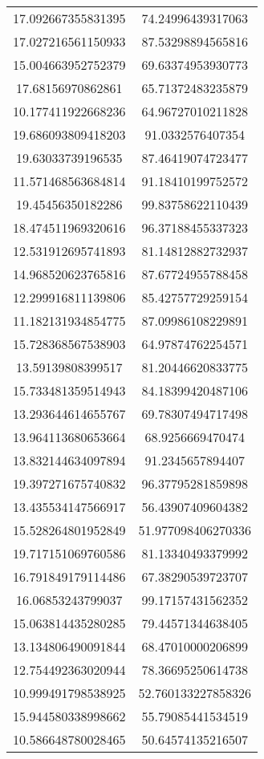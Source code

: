 \begin{table}
\begin{tabular}{cc}
17.092667355831395 & 74.24996439317063 \\
17.027216561150933 & 87.53298894565816 \\
15.004663952752379 & 69.63374953930773 \\
17.68156970862861 & 65.71372483235879 \\
10.177411922668236 & 64.96727010211828 \\
19.686093809418203 & 91.0332576407354 \\
19.63033739196535 & 87.46419074723477 \\
11.571468563684814 & 91.18410199752572 \\
19.45456350182286 & 99.83758622110439 \\
18.474511969320616 & 96.37188455337323 \\
12.531912695741893 & 81.14812882732937 \\
14.968520623765816 & 87.67724955788458 \\
12.299916811139806 & 85.42757729259154 \\
11.182131934854775 & 87.09986108229891 \\
15.728368567538903 & 64.97874762254571 \\
13.59139808399517 & 81.20446620833775 \\
15.733481359514943 & 84.18399420487106 \\
13.293644614655767 & 69.78307494717498 \\
13.964113680653664 & 68.9256669470474 \\
13.832144634097894 & 91.2345657894407 \\
19.397271675740832 & 96.37795281859898 \\
13.435534147566917 & 56.43907409604382 \\
15.528264801952849 & 51.977098406270336 \\
19.717151069760586 & 81.13340493379992 \\
16.791849179114486 & 67.38290539723707 \\
16.06853243799037 & 99.17157431562352 \\
15.063814435280285 & 79.44571344638405 \\
13.134806490091844 & 68.47010000206899 \\
12.754492363020944 & 78.36695250614738 \\
10.999491798538925 & 52.760133227858326 \\
15.944580338998662 & 55.79085441534519 \\
10.586648780028465 & 50.64574135216507 \\

\end{tabular}
\end{table}
